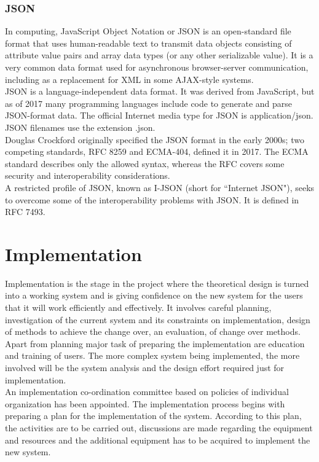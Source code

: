 \documentclass[12pt,a4 paper]{report}
\begin{document}
\subsection{JSON}

In computing, JavaScript Object Notation or JSON is an open-standard file format that uses human-readable text to transmit data objects consisting of attribute value pairs and array data types (or any other serializable value). It is a very common data format used for asynchronous browser-server communication, including as a replacement for XML in some AJAX-style systems. \\

JSON is a language-independent data format. It was derived from JavaScript, but as of 2017 many programming languages include code to generate and parse JSON-format data. The official Internet media type for JSON is application/json. JSON filenames use the extension .json. \\

Douglas Crockford originally specified the JSON format in the early 2000s; two competing standards, RFC 8259 and ECMA-404, defined it in 2017. The ECMA standard describes only the allowed syntax, whereas the RFC covers some security and interoperability considerations. \\

A restricted profile of JSON, known as I-JSON (short for ``Internet JSON"), seeks to overcome some of the interoperability problems with JSON. It is defined in RFC 7493.

\chapter{Implementation}
Implementation is the stage in the project where the theoretical design is turned into a working system and is giving 
confidence on the new system for the users that it will work efficiently and effectively. It involves careful planning, investigation of the current system and its constraints on implementation, design of methods to achieve the change over, an evaluation, of change over methods. Apart from planning major task of preparing the implementation are education and training of users. The more complex system being implemented, the more involved will be the system analysis and the design effort required just for implementation. \\

An implementation co-ordination committee based on policies of individual organization has been appointed. The implementation process begins with preparing a plan for the implementation of the system. According to this plan, the activities are to be carried out, discussions are made regarding the equipment and resources and the additional equipment has to be acquired to implement the new system. \\
\end{document}
